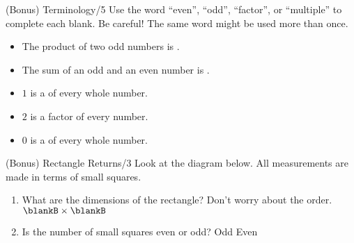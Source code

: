\documentclass[12pt,letterpaper]{article}
\begin{document}
\begin{problem}{(Bonus) Terminology\hfill/5}
 Use the word ``even'', ``odd'', ``factor'', or ``multiple'' to complete each
 blank. Be careful! The same word might be used more than once.

 \begin{itemize}
  \item The product of two odd numbers is \underline{\hspace{6em}}.
  \item The sum of an odd and an even number is \underline{\hspace{6em}}.
  \item $1$ is a \underline{\hspace{6em}} of every whole number.
  \item $2$ is a factor of every \underline{\hspace{6em}} number.
  \item $0$ is a \underline{\hspace{6em}} of every whole number.
 \end{itemize}

\end{problem}

\begin{problem}{(Bonus) Rectangle Returns\hfill/3}
 Look at the diagram below. All measurements are made in terms of small squares.

 \begin{center}
 \end{center}

 \begin{enumerate}
  \item What are the dimensions of the rectangle? Don't worry about the order.
  \hfill \(\blankB\times\blankB\)
  \item Is the number of small squares even or odd? \hfill Odd \hspace{1em}
  Even
 \end{enumerate}
\end{problem}
\end{document}
